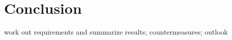 \section{Conclusion} %
\label{sec:conclusion}

work out requirements and summarize results; countermeasures; outlook

